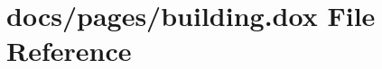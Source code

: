 \hypertarget{building_8dox}{\section{docs/pages/building.dox File Reference}
\label{building_8dox}
}
